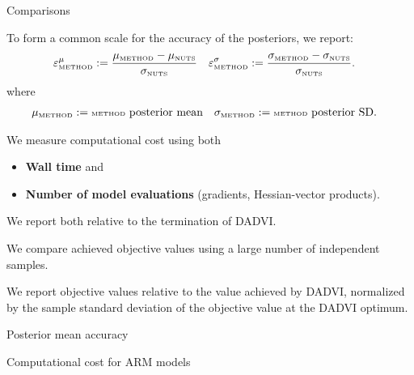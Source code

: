 \documentclass[8pt]{beamer}\usepackage[]{graphicx}\usepackage[]{color}
\begin{document}
\begin{frame}{Comparisons}

To form a common scale for the accuracy of the
posteriors, we report:
%
\begin{align*}
\muerr_{\method} :={}& \frac{\mu_{\method} - \mu_{\nuts}}{\sigma_{\nuts}}
&
\sderr_{\method} :={}& \frac{\sigma_{\method} - \sigma_{\nuts}}{\sigma_{\nuts}}.
%
\end{align*}
%
where
%
\begin{align*}
%
\mu_{\method} :={}& \method \text{ posterior mean}
&
\sigma_{\method} :={}& \method\text{ posterior SD}.
%
\end{align*}
   
\pause
\hrulefill

We measure computational cost using both
%
\begin{itemize}
\item \textbf{Wall time} and 
\item \textbf{Number of model evaluations} (gradients, Hessian-vector products).
\end{itemize}
%
We report both relative to the termination of DADVI.

\pause
\hrulefill

We compare achieved objective values using a large number of independent samples.

We report objective values relative to the value achieved by DADVI,
normalized by the sample standard deviation of the objective value at the
DADVI optimum.

\end{frame}




\begin{frame}{Posterior mean accuracy}
    \PosteriorMeanAccuracy{}
\end{frame}


\begin{frame}{Computational cost for ARM models}
\RuntimeARM{}
\end{frame}
\end{document}

